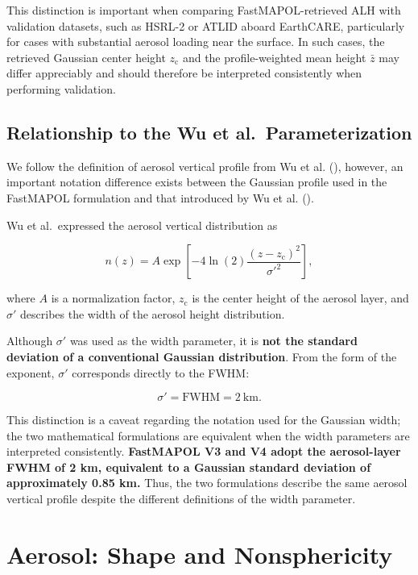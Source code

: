\documentclass[
  11pt,
  letterpaper,
]{scrreprt}
\begin{document}
This distinction is important when comparing FastMAPOL-retrieved ALH
with validation datasets, such as HSRL-2 or ATLID aboard EarthCARE,
particularly for cases with substantial aerosol loading near the
surface. In such cases, the retrieved Gaussian center height
\(z_{\mathrm{c}}\) and the profile-weighted mean height \(\bar{z}\) may
differ appreciably and should therefore be interpreted consistently when
performing validation.

\section{Relationship to the Wu et
al.~Parameterization}\label{relationship-to-the-wu-et-al.-parameterization}

We follow the definition of aerosol vertical profile from Wu et al.
(), however, an important notation
difference exists between the Gaussian profile used in the FastMAPOL
formulation and that introduced by Wu et al.
().

Wu et al.~expressed the aerosol vertical distribution as

\[
n(z) =
A\exp\left[
-4\ln(2)
\frac{(z-z_{\mathrm{c}})^2}{\sigma'^2}
\right],
\]

where \(A\) is a normalization factor, \(z_{\mathrm{c}}\) is the center
height of the aerosol layer, and \(\sigma'\) describes the width of the
aerosol height distribution.

Although \(\sigma'\) was used as the width parameter, it is \textbf{not
the standard deviation of a conventional Gaussian distribution}. From
the form of the exponent, \(\sigma'\) corresponds directly to the FWHM:

\[
\sigma' = \mathrm{FWHM} = 2~\mathrm{km}.
\]

This distinction is a caveat regarding the notation used for the
Gaussian width; the two mathematical formulations are equivalent when
the width parameters are interpreted consistently. \textbf{FastMAPOL V3
and V4 adopt the aerosol-layer FWHM of 2 km, equivalent to a Gaussian
standard deviation of approximately 0.85 km.} Thus, the two formulations
describe the same aerosol vertical profile despite the different
definitions of the width parameter.

\chapter{Aerosol: Shape and Nonsphericity}\label{sec-aerosol-shape}
\end{document}
